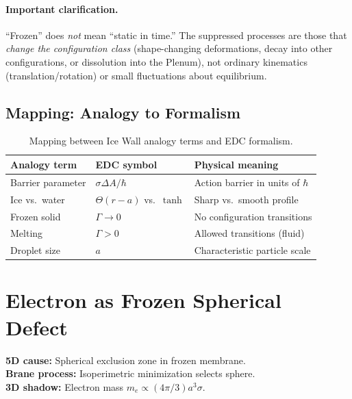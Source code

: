 \paragraph{Important clarification.}
``Frozen'' does \emph{not} mean ``static in time.'' The suppressed processes are those
that \emph{change the configuration class} (shape-changing deformations, decay into
other configurations, or dissolution into the Plenum), not ordinary kinematics
(translation/rotation) or small fluctuations about equilibrium.

\subsection{Mapping: Analogy to Formalism}

\begin{table}[H]
\centering
\begin{tabular}{lll}
\toprule
\textbf{Analogy term} & \textbf{EDC symbol} & \textbf{Physical meaning} \\
\midrule
Barrier parameter & $\sigma\Delta A/\hbar$ & Action barrier in units of $\hbar$ \\
Ice vs.\ water & $\Theta(r-a)$ vs.\ $\tanh$ & Sharp vs.\ smooth profile \\
Frozen solid & $\Gamma \to 0$ & No configuration transitions \\
Melting & $\Gamma > 0$ & Allowed transitions (fluid) \\
Droplet size & $a$ & Characteristic particle scale \\
\bottomrule
\end{tabular}
\caption{Mapping between Ice Wall analogy terms and EDC formalism.}
\label{tab:ch2_analogy_mapping}
\end{table}


\section{Electron as Frozen Spherical Defect}
\label{sec:ch2_electron}

\begin{tcolorbox}[colback=gray!5!white, colframe=gray!50!black,
    title=\textbf{5D Cause → 3D Shadow}]
\textbf{5D cause:} Spherical exclusion zone in frozen membrane.\\
\textbf{Brane process:} Isoperimetric minimization selects sphere.\\
\textbf{3D shadow:} Electron mass $m_e \propto (4\pi/3) a^3 \sigma$.
\end{tcolorbox}

